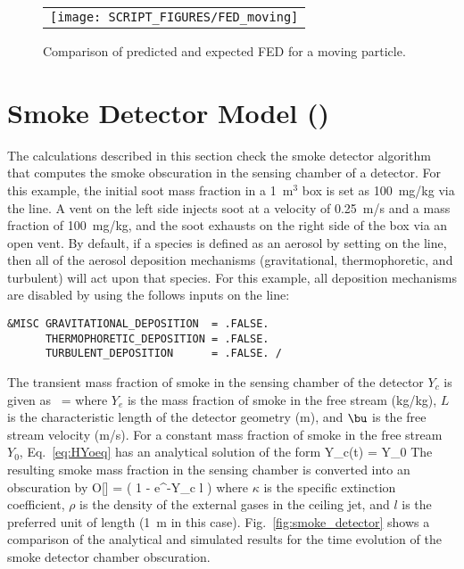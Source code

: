 \documentclass[11pt]{book}
\begin{document}
\begin{figure}[ht]
\centering
\begin{tabular}{c}
\texttt{[image: SCRIPT\_FIGURES/FED\_moving]}
\end{tabular}
\caption[The FED value in  case]{Comparison of predicted and expected FED for a moving particle.}
\label{fig:FED_moving}
\end{figure}

\section{Smoke Detector Model (\texorpdfstring{}{smoke\_detector}) }
\label{smoke_detector}

The calculations described in this section check the smoke detector algorithm that computes the smoke obscuration in the sensing chamber of a detector. For this example, the initial soot mass fraction in a 1~m$^3$ box is set as 100~mg/kg via the  line. A vent on the left side injects soot at a velocity of 0.25~m/s and a mass fraction of 100~mg/kg, and the soot exhausts on the right side of the box via an open vent. By default, if a species is defined as an aerosol by setting  on the  line, then all of the aerosol deposition mechanisms (gravitational, thermophoretic, and turbulent) will act upon that species. For this example, all deposition mechanisms are disabled by using the follows inputs on the  line:

\begin{lstlisting}
&MISC GRAVITATIONAL_DEPOSITION  = .FALSE.
      THERMOPHORETIC_DEPOSITION = .FALSE.
      TURBULENT_DEPOSITION      = .FALSE. /
\end{lstlisting}

\noindent The transient mass fraction of smoke in the sensing chamber of the detector $Y_c$ is given as~\cite{FDS_Tech_Guide}
\be
{} =  \label{eq:HYoeq}
\ee
where $Y_e$ is the mass fraction of smoke in the free stream (kg/kg), $L$ is the characteristic length of the detector geometry (m), and $\bu$ is the free stream velocity (m/s). For a constant mass fraction of smoke in the free stream $Y_0$, Eq.~\ref{eq:HYoeq} has an analytical solution of the form
\be
Y_c(t) = Y_0 
\ee
The resulting smoke mass fraction in the sensing chamber is converted into an obscuration by
\be
O[] = \left( 1 - e^{-\kappa \rho Y_c l} \right) 
\ee
where $\kappa$ is the specific extinction coefficient, $\rho$ is the density of the external gases in the ceiling jet,
and $l$ is the preferred unit of length (1~m in this case).
Fig.~\ref{fig:smoke_detector} shows a comparison of the analytical and simulated results for the time evolution of the smoke detector chamber obscuration.
\end{document}
